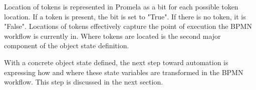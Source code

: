 Location of tokens is represented in Promela as a bit for each possible token location. If a token is present, the bit is set to "True". If there is no token, it is "False". Locations of tokens effectively capture the point of execution the BPMN workflow is currently in. Where tokens are located is the second major component of the object state definition.

\begin{comment}
We acknowledge that restricting each location to a single token is a fairly tight restriction on the generic petri-net structure, but it is sufficient for most BPMN workflows. BPMN is designed to be easily readable and understandable at a glance, while a complex and unintuitive workflow structure is usually required to result in multiple tokens at the same location.
\end{comment}

With a concrete object state defined, the next step toward automation is expressing how and where these state variables are transformed in the BPMN workflow. This step is discussed in the next section.